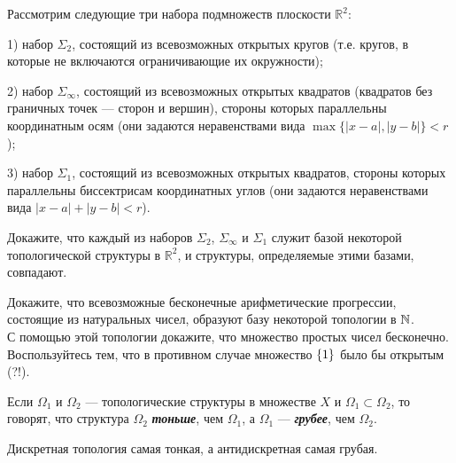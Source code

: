 \documentclass{article}
\begin{document}
    \begin{task_boxed}
        Рассмотрим следующие три набора подмножеств плоскости \(\mathbb{R}^2\):

        1) набор \(\Sigma_2\), состоящий из всевозможных открытых кругов (т.е. кругов, в которые не включаются ограничивающие их окружности);

        2) набор \(\Sigma_\infty\), состоящий из всевозможных открытых квадратов (квадратов без граничных точек — сторон и вершин), стороны которых параллельны координатным осям (они задаются неравенствами вида \(\max\{|x - a|, |y - b|\} < r\));

        3) набор \(\Sigma_1\), состоящий из всевозможных открытых квадратов, стороны которых параллельны биссектрисам координатных углов (они задаются неравенствами вида \(|x - a| + |y - b| < r\)).

        Докажите, что каждый из наборов \(\Sigma_2\), \(\Sigma_\infty\) и \(\Sigma_1\) служит базой некоторой топологической структуры в \(\mathbb{R}^2\), и структуры, определяемые этими базами, совпадают.
    \end{task_boxed}

    \begin{task_boxed}[*]
        Докажите, что всевозможные бесконечные арифметические прогрессии, состоящие из натуральных чисел, образуют базу некоторой топологии в $\N$.\\
        С помощью этой топологии докажите, что множество простых чисел бесконечно.\\
        Воспользуйтесь тем, что в противном случае множество $\set*{1}$ было бы открытым (?!).
    \end{task_boxed}

    \begin{definition_boxed}
        Если $\Omega_1$ и $\Omega_2$ — топологические структуры в множестве $X$ и $\Omega_1 \subset \Omega_2$, то говорят, что структура $\Omega_2$ \textbf{\textit{тоньше}}, чем $\Omega_1$, а $\Omega_1$ — \textbf{\textit{грубее}}, чем $\Omega_2$.
    \end{definition_boxed}

    \begin{example}
        Дискретная топология самая тонкая, а антидискретная самая грубая.
    \end{example}

    \newpage
\end{document}
